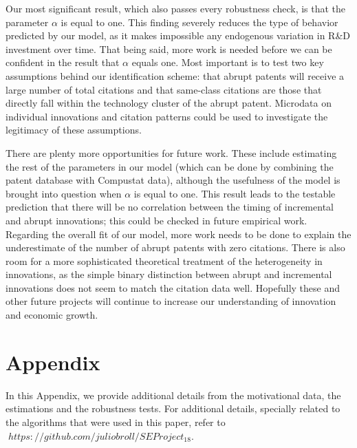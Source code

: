 \documentclass[letterpaper,12pt]{article}
\theoremstyle{definition}
\begin{document}
Our most significant result, which also passes every robustness check, is that the parameter $\alpha$ is equal to one. This finding severely reduces the type of behavior predicted by our model, as it makes impossible any endogenous variation in R\&D investment over time. That being said, more work is needed before we can be confident in the result that $\alpha$ equals one. Most important is to test two key assumptions behind our identification scheme: that abrupt patents will receive a large number of total citations and that same-class citations are those that directly fall within the technology cluster of the abrupt patent. Microdata on individual innovations and citation patterns could be used to investigate the legitimacy of these assumptions.

There are plenty more opportunities for future work. These include estimating the rest of the parameters in our model (which can be done by combining the patent database with Compustat data), although the usefulness of the model is brought into question when $\alpha$ is equal to one. This result leads to the testable prediction that there will be no correlation between the timing of incremental and abrupt innovations; this could be checked in future empirical work. Regarding the overall fit of our model, more work needs to be done to explain the underestimate of the number of abrupt patents with zero citations. There is also room for a more sophisticated theoretical treatment of the heterogeneity in innovations, as the simple binary distinction between abrupt and incremental innovations does not seem to match the citation data well. Hopefully these and other future projects will continue to increase our understanding of innovation and economic growth.



\nocite{*}


\clearpage

\appendix
\section{Appendix}\label{sec:app1}

In this Appendix, we provide additional details from the motivational data, the estimations and the robustness tests. For additional details, specially related to the algorithms that were used in this paper, refer to $\;https://github.com/juliobroll/SEProject_18$.
\end{document}
